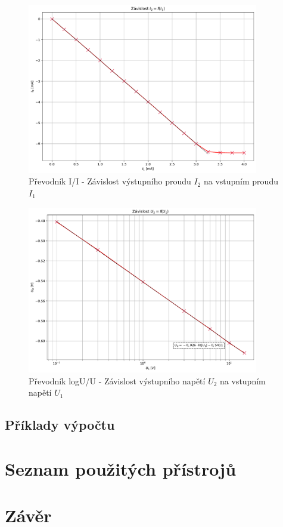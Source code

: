 \documentclass[a4paper, czech]{article}
\begin{document}
\begin{figure}[H]
    \centering
    \includegraphics[width=0.9\textwidth]{grafy/graf_prevodnik_II.pdf}
    \caption{Převodník I/I - Závislost výstupního proudu $I_2$ na vstupním proudu $I_1$}
\end{figure}

\begin{figure}[H]
    \centering
    \includegraphics[width=0.9\textwidth]{grafy/graf_prevodnik_logUU.pdf}
    \caption{Převodník logU/U - Závislost výstupního napětí $U_2$ na vstupním napětí $U_1$}
\end{figure}

\subsection{Příklady výpočtu}

\section{Seznam použitých přístrojů}

\section{Závěr}
\end{document}
